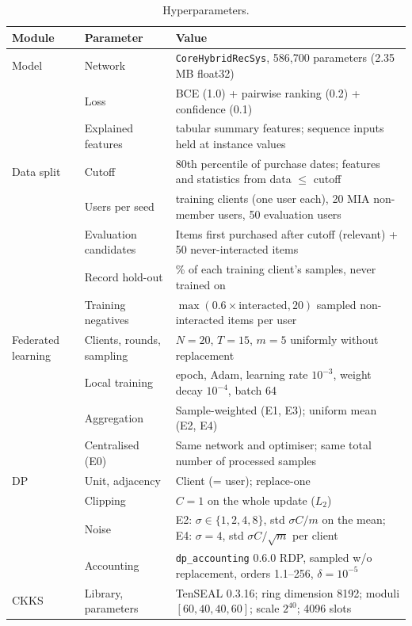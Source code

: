 \documentclass[11pt,a4paper]{article}
\begin{document}
\begin{table}[H]
\centering
\footnotesize
\setlength{\tabcolsep}{3.5pt}
\caption{Hyperparameters.}
\label{tab:supp_hyperparams}
\begin{tabularx}{\textwidth}{>{\raggedright\arraybackslash}p{2.6cm}>{\raggedright\arraybackslash}p{3.6cm}>{\raggedright\arraybackslash}X}
\toprule
Module & Parameter & Value \\
\midrule
Model & Network & \texttt{CoreHybridRecSys}, 586,700 parameters (2.35 MB float32) \\
 & Loss & BCE (1.0) + pairwise ranking (0.2) + confidence (0.1) \\
 & Explained features & 43 tabular summary features; sequence inputs held at instance values \\
Data split & Cutoff & 80th percentile of purchase dates; features and statistics from data $\leq$ cutoff \\
 & Users per seed & 20 training clients (one user each), 20 MIA non-member users, 50 evaluation users \\
 & Evaluation candidates & Items first purchased after cutoff (relevant) + 50 never-interacted items \\
 & Record hold-out & 20\% of each training client's samples, never trained on \\
 & Training negatives & $\max(0.6\times\text{interacted}, 20)$ sampled non-interacted items per user \\
Federated learning & Clients, rounds, sampling & $N=20$, $T=15$, $m=5$ uniformly without replacement \\
 & Local training & 1 epoch, Adam, learning rate $10^{-3}$, weight decay $10^{-4}$, batch 64 \\
 & Aggregation & Sample-weighted (E1, E3); uniform mean (E2, E4) \\
 & Centralised (E0) & Same network and optimiser; same total number of processed samples \\
DP & Unit, adjacency & Client (= user); replace-one \\
 & Clipping & $C=1$ on the whole update ($L_2$) \\
 & Noise & E2: $\sigma\in\{1,2,4,8\}$, std $\sigma C/m$ on the mean; E4: $\sigma=4$, std $\sigma C/\sqrt m$ per client \\
 & Accounting & \texttt{dp\_accounting} 0.6.0 RDP, sampled w/o replacement, orders 1.1--256, $\delta=10^{-5}$ \\
CKKS & Library, parameters & TenSEAL 0.3.16; ring dimension 8192; moduli $[60,40,40,60]$; scale $2^{40}$; 4096 slots \\

\end{tabularx}
\end{table}
\end{document}
